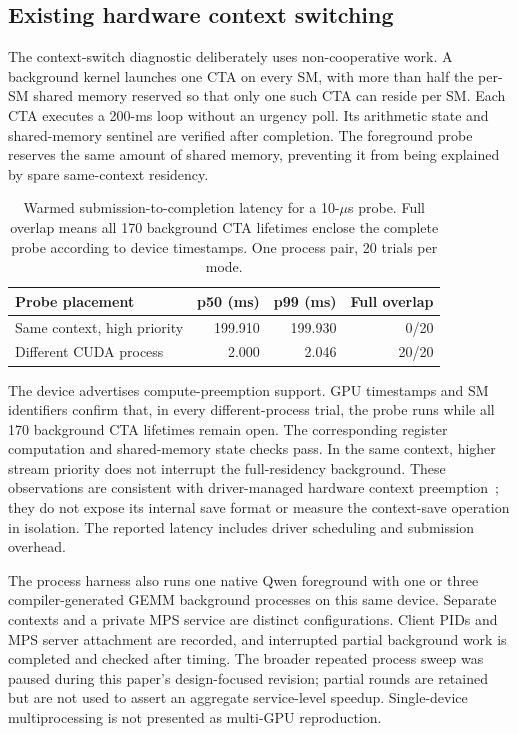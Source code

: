 \subsection{Existing hardware context switching}
The context-switch diagnostic deliberately uses non-cooperative work. A
background kernel launches one CTA on every SM, with more than half the
per-SM shared memory reserved so that only one such CTA can reside per SM.
Each CTA executes a 200-ms loop without an urgency poll. Its arithmetic
state and shared-memory sentinel are verified after completion. The foreground
probe reserves the same amount of shared memory, preventing it from being
explained by spare same-context residency.

\begin{table}[t]
\centering\small
\setlength{\tabcolsep}{3pt}
\begin{tabular}{lrrr}
\toprule
Probe placement & p50 (ms) & p99 (ms) & Full overlap \\
\midrule
Same context, high priority & 199.910 & 199.930 & 0/20 \\
Different CUDA process & 2.000 & 2.046 & 20/20 \\
\bottomrule
\end{tabular}
\caption{Warmed submission-to-completion latency for a 10-$\mu$s probe.
Full overlap means all 170 background CTA lifetimes enclose the complete
probe according to device timestamps. One process pair, 20 trials per mode.}
\label{tab:context}
\end{table}

The device advertises compute-preemption support. GPU timestamps and SM
identifiers confirm that, in every different-process trial, the probe runs
while all 170 background CTA lifetimes remain open. The corresponding
register computation and shared-memory state checks pass. In the same
context, higher stream priority does not interrupt the full-residency
background. These observations are consistent with driver-managed hardware
context preemption~\cite{CUDAComputePreemption}; they do not expose its
internal save format or measure the context-save operation in isolation.
The reported latency includes driver scheduling and submission overhead.

The process harness also runs one native Qwen foreground with one or three
compiler-generated GEMM background processes on this same device. Separate
contexts and a private MPS service are distinct configurations. Client PIDs
and MPS server attachment are recorded, and interrupted partial background
work is completed and checked after timing. The broader repeated process
sweep was paused during this paper's design-focused revision; partial rounds
are retained but are not used to assert an aggregate service-level speedup.
Single-device multiprocessing is not presented as multi-GPU reproduction.

